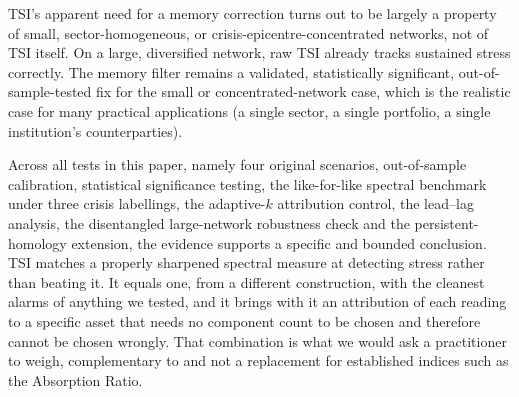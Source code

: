 \documentclass[11pt,a4paper]{article}
\begin{document}
TSI's apparent need for a memory correction turns out to be largely a
property of small, sector-homogeneous, or crisis-epicentre-concentrated
networks, not of TSI itself. On a large, diversified network, raw
TSI already tracks sustained stress correctly. The memory filter remains
a validated, statistically significant, out-of-sample-tested fix for the
small or concentrated-network case, which is the realistic case for many
practical applications (a single sector, a single portfolio, a single
institution's counterparties).

Across all tests in this paper, namely four original scenarios, out-of-sample
calibration, statistical significance testing, the like-for-like spectral
benchmark under three crisis labellings, the adaptive-$k$ attribution control,
the lead--lag analysis, the disentangled large-network robustness check and the
persistent-homology extension, the evidence supports a specific and bounded
conclusion. TSI matches a properly sharpened spectral measure at
detecting stress rather than beating it. It equals one,
from a different construction, with the cleanest alarms of anything we tested,
and it brings with it an attribution of each reading to a specific asset that
needs no component count to be chosen and therefore cannot be chosen wrongly.
That combination is what we would ask a practitioner to weigh, complementary to
and not a replacement for established indices such as the Absorption Ratio.
\end{document}
